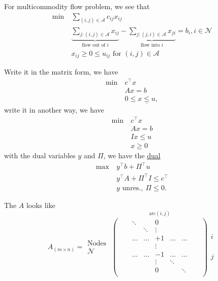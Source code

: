\begin{eg}
	For multicommodity flow problem, we see that
	\[
		\begin{aligned}
			\min~ & \sum\limits_{(i, j)\in \mathcal{A}} c_{ij}x_{ij}                                                                                                                                                     \\
			      & \underbrace{\sum\limits_{j\colon (i, j)\in\mathcal{A}} x_{ij}}_{\text{flow out of }i} - \underbrace{\sum\limits_{j\colon (j, i)\in\mathcal{A}} x_{ji}}_{\text{flow into }i}  = b_i, i \in\mathcal{N} \\
			      & x_{ij}\geq 0 \leq u_{ij} \text{ for }(i, j)\in\mathcal{A}
		\end{aligned}
	\]
\end{eg}
\begin{explanation}
	Write it in the matrix form, we have
	\[
		\begin{aligned}
			\min~ & c^{\top}x                  \\
			      & Ax = b                     \\
			      & 0\leq \underline{x\leq u},
		\end{aligned}
	\]
	write it in another way, we have
	\[
		\begin{aligned}
			\min~ & c^{\top}x \\
			      & Ax = b    \\
			      & Ix\leq u  \\
			      & x\geq 0
		\end{aligned}
	\]
	with the dual variables \(y\) and \(\Pi\), we have the \hyperref[def:dual]{dual}
	\[
		\begin{aligned}
			\max~ & y^{\top}b + \Pi^{\top}u            \\
			      & y^{\top}A+\Pi^{\top}I\leq c^{\top} \\
			      & y\text{ unres.},\ \Pi\leq 0.
		\end{aligned}
	\]

	The \(A\) looks like
	\[
		A_{(m\times n)} = \substack{\text{Nodes }\\\mathcal{N}}\overset{\mathrm{arc}(i, j)}{
			\begin{pmatrix}
				 &  & \ddots &        & 0      &        &        &  & \\
				 &  &        & \ddots & \vdots &        &        &  & \\
				 &  & \dots  & \dots  & +1     & \dots  & \dots  &  & \\
				 &  &        &        & \vdots &        &        &  & \\
				 &  & \dots  & \dots  & -1     & \dots  & \dots  &  & \\
				 &  &        &        & \vdots & \ddots &        &  & \\
				 &  &        &        & 0      &        & \ddots &  & \\
			\end{pmatrix}}\substack{i\\ \\ \\ \\ \\ j}
	\]


\end{explanation}
